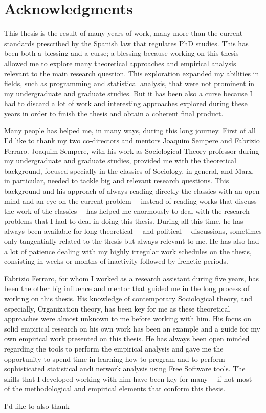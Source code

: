 \chapter*{Acknowledgments}

This thesis is the result of many years of work, many more than the current standards prescribed by the Spanish law that regulates PhD studies. This has been both a blessing and a curse; a blessing because working on this thesis allowed me to explore many theoretical approaches and empirical analysis relevant to the main research question. This exploration expanded my abilities in fields, such as programming and statistical analysis, that were not prominent in my undergraduate and graduate studies. But it has been also a curse because I had to discard a lot of work and interesting approaches explored during these years in order to finish the thesis and obtain a coherent final product.

Many people has helped me, in many ways, during this long journey. First of all I'd like to thank my two co-directors and mentors Joaquim Sempere and Fabrizio Ferraro. Joaquim Sempere, with his work as Sociological Theory professor during my undergraduate and graduate studies, provided me with the theoretical background, focused specially in the classics of Sociology, in general, and Marx, in particular, needed to tackle big and relevant research questions. This background and his approach of always reading directly the classics with an open mind and an eye on the current problem ---instead of reading works that discuss the work of the classics--- has helped me enormously to deal with the research problems that I had to deal in doing this thesis. During all this time, he has always been available for long theoretical ---and political--- discussions, sometimes only tangentially related to the thesis but always relevant to me. He has also had a lot of patience dealing with my highly irregular work schedules on the thesis, consisting in weeks or months of inactivity followed by frenetic periods.

Fabrizio Ferraro, for whom I worked as a research assistant during five years, has been the other big influence and mentor that guided me in the long process of working on this thesis. His knowledge of contemporary Sociological theory, and especially, Organization theory, has been key for me as these theoretical approaches were almost unknown to me before working with him. His focus on solid empirical research on his own work has been an example and a guide for my own empirical work presented on this thesis. He has always been open minded regarding the tools to perform the empirical analysis and gave me the opportunity to spend time in learning how to program and to perform sophisticated statistical andi network analysis using Free Software tools. The skills that I developed working with him have been key for many ---if not most--- of the methodological and empirical elements that conform this thesis.

I'd like to also thank 

\newpage
